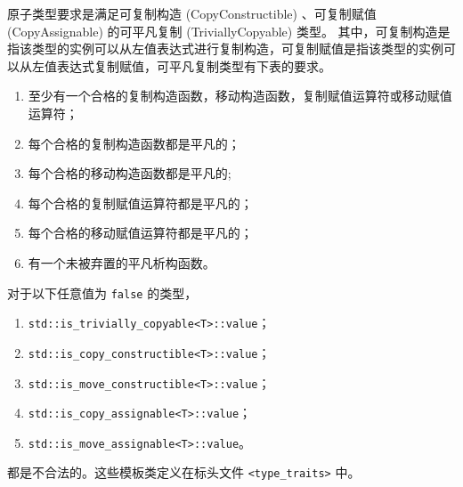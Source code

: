 原子类型要求是满足可复制构造 (CopyConstructible) 、可复制赋值 (CopyAssignable) 的可平凡复制 (TriviallyCopyable) 类型。
其中，可复制构造是指该类型的实例可以从左值表达式进行复制构造，可复制赋值是指该类型的实例可以从左值表达式复制赋值，可平凡复制类型有下表的要求。
\begin{enumerate}
\item 至少有一个合格的复制构造函数，移动构造函数，复制赋值运算符或移动赋值运算符；
\item 每个合格的复制构造函数都是平凡的；
\item 每个合格的移动构造函数都是平凡的;
\item 每个合格的复制赋值运算符都是平凡的；
\item 每个合格的移动赋值运算符都是平凡的；
\item 有一个未被弃置的平凡析构函数。
\end{enumerate}
对于以下任意值为 \verb`false` 的类型，
\begin{enumerate}
\item \verb`std::is_trivially_copyable<T>::value`；
\item \verb`std::is_copy_constructible<T>::value`；
\item \verb`std::is_move_constructible<T>::value`；
\item \verb`std::is_copy_assignable<T>::value`；
\item \verb`std::is_move_assignable<T>::value`。
\end{enumerate}
都是不合法的。这些模板类定义在标头文件 \verb`<type_traits>` 中。